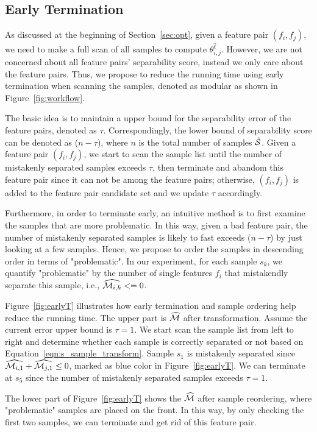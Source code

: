 \subsection{Early Termination} \label{ssec:earlyT}
As discussed at the beginning of Section~\ref{sec:opt}, given a feature pair $(f_i,f_j)$, we need to make a full scan of all samples to compute $\theta_{i,j}^{\hat{\ell}}$. However, we are not concerned about all feature pairs' separability score, instead we only care about the \topk feature pairs. Thus, we propose to reduce the running time using early termination when scanning the samples, denoted as \earlyT modular as shown in Figure~\ref{fig:workflow}.

 The basic idea is to maintain a upper bound for the separability error of the \topk feature pairs, denoted as $\tau$. Correspondingly, the lower bound of separability score can be denoted as ($n-\tau$), where $n$ is the total number of samples $\hat{\sss}$. Given a feature pair $(f_i,f_j)$, we start to scan the sample list until the number of mistakenly separated samples exceeds $\tau$, then terminate and abandom this feature pair since it can not be among the \topk feature pairs; otherwise, $(f_i,f_j)$ is added to the feature pair candidate set and we update $\tau$ accordingly.

 Furthermore, in order to terminate early, an intuitive method is to first examine the samples that are more problematic. In this way, given a bad feature pair, the number of mistakenly separated samples is likely to fast exceeds ($n-\tau$) by just looking at a few samples. Hence, we propose to order the samples in descending order in terms of "problematic". In our experiment, for each sample $s_k$, we quantify "problematic" by the number of single features $f_i$ that mistakendly separate this sample, i.e., $\widehat{\mm_{i,k}}<=0$.

\begin{example}
Figure~\ref{fig:earlyT} illustrates how early termination and sample ordering help reduce the running time. The upper part is $\widehat{\mm}$ after transformation. Assume the current error upper bound is $\tau=1$. We start scan the sample list from left to right and determine whether each sample is correctly separated or not based on Equation~\ref{eqn:s_sample_transform}. Sample $s_1$ is mistakenly separated since $\widehat{\mm_{i,1}}+\widehat{\mm_{j,1}}\leq0$, marked as blue color in Figure~\ref{fig:earlyT}. We can terminate at $s_5$ since the number of mistakenly separated samples exceeds $\tau=1$.

The lower part of Figure~\ref{fig:earlyT} shows the $\widehat{\mm}$ after sample reordering, where "problematic" samples are placed on the front. In this way, by only checking the first two samples, we can terminate and get rid of this feature pair.
\end{example}

